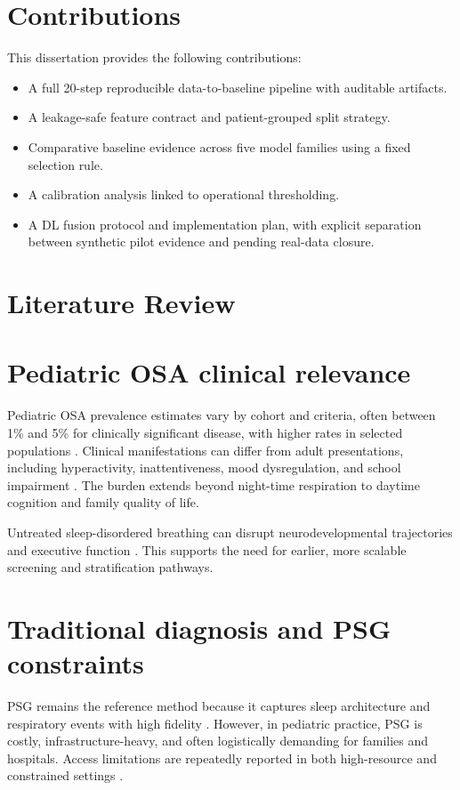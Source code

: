 \documentclass[10pt,a4paper,twocolumn]{article}
\newcommand{\chapter}[1]{\section{#1}}
\begin{document}
\section{Contributions}
This dissertation provides the following contributions:
\begin{itemize}[leftmargin=1.2cm]
    \item A full 20-step reproducible data-to-baseline pipeline with auditable artifacts.
    \item A leakage-safe feature contract and patient-grouped split strategy.
    \item Comparative baseline evidence across five model families using a fixed selection rule.
    \item A calibration analysis linked to operational thresholding.
    \item A DL fusion protocol and implementation plan, with explicit separation between synthetic pilot evidence and pending real-data closure.
\end{itemize}

\chapter{Literature Review}
\section{Pediatric OSA clinical relevance}
Pediatric OSA prevalence estimates vary by cohort and criteria, often between 1\% and 5\% for clinically significant disease, with higher rates in selected populations \citep{meltzer2011,deshpande2022,solano2023}. Clinical manifestations can differ from adult presentations, including hyperactivity, inattentiveness, mood dysregulation, and school impairment \citep{gupta2024,beebe2010}. The burden extends beyond night-time respiration to daytime cognition and family quality of life.

Untreated sleep-disordered breathing can disrupt neurodevelopmental trajectories and executive function \citep{beebe2006,vlahandonis2013}. This supports the need for earlier, more scalable screening and stratification pathways.

\section{Traditional diagnosis and PSG constraints}
PSG remains the reference method because it captures sleep architecture and respiratory events with high fidelity \citep{berry2023,rundo2019}. However, in pediatric practice, PSG is costly, infrastructure-heavy, and often logistically demanding for families and hospitals. Access limitations are repeatedly reported in both high-resource and constrained settings \citep{solano2023,xu2019cloud}.
\end{document}
